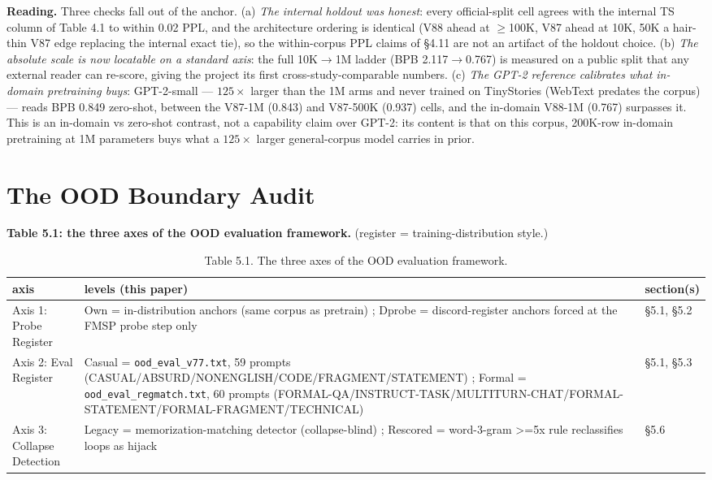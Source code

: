 \documentclass[11pt]{article}
\begin{document}
\textbf{Reading.} Three checks fall out of the anchor. (a) \emph{The internal holdout was honest}: every official-split cell agrees with the internal TS column of Table 4.1 to within 0.02 PPL, and the architecture ordering is identical (V88 ahead at $\geq$100K, V87 ahead at 10K, 50K a hair-thin V87 edge replacing the internal exact tie), so the within-corpus PPL claims of \S4.11 are not an artifact of the holdout choice. (b) \emph{The absolute scale is now locatable on a standard axis}: the full 10K$\to$1M ladder (BPB 2.117$\to$0.767) is measured on a public split that any external reader can re-score, giving the project its first cross-study-comparable numbers. (c) \emph{The GPT-2 reference calibrates what in-domain pretraining buys}: GPT-2-small --- $125\times$ larger than the 1M arms and never trained on TinyStories (WebText predates the corpus) --- reads BPB 0.849 zero-shot, between the V87-1M (0.843) and V87-500K (0.937) cells, and the in-domain V88-1M (0.767) surpasses it. This is an in-domain vs zero-shot contrast, not a capability claim over GPT-2: its content is that on this corpus, 200K-row in-domain pretraining at 1M parameters buys what a $125\times$ larger general-corpus model carries in prior.

\section{The OOD Boundary Audit}

\textbf{Table 5.1: the three axes of the OOD evaluation framework.} (register = training-distribution style.)

\begin{table}[!t]
\centering
\small
\caption*{Table 5.1. The three axes of the OOD evaluation framework.}
\begin{tabular}{p{3.5cm}p{7cm}l}
\toprule
axis & levels (this paper) & section(s) \\
\midrule
Axis 1: Probe Register & Own = in-distribution anchors (same corpus as pretrain) ; Dprobe = discord-register anchors forced at the FMSP probe step only & \S5.1, \S5.2 \\
Axis 2: Eval Register & Casual = \texttt{ood\_eval\_v77.txt}, 59 prompts (CASUAL/\allowbreak ABSURD/\allowbreak NONENGLISH/\allowbreak CODE/\allowbreak FRAGMENT/\allowbreak STATEMENT) ; Formal = \texttt{ood\_eval\_regmatch.txt}, 60 prompts (FORMAL-QA/\allowbreak INSTRUCT-TASK/\allowbreak MULTITURN-CHAT/\allowbreak FORMAL-STATEMENT/\allowbreak FORMAL-FRAGMENT/\allowbreak TECHNICAL) & \S5.1, \S5.3 \\
Axis 3: Collapse Detection & Legacy = memorization-matching detector (collapse-blind) ; Rescored = word-3-gram >=5x rule reclassifies loops as hijack & \S5.6 \\
\bottomrule
\end{tabular}
\end{table}
\end{document}
